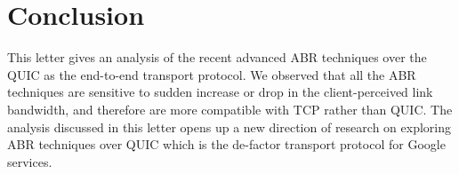 \section{Conclusion}
This letter gives an analysis of the recent advanced ABR techniques over the QUIC as the end-to-end transport protocol. We observed that all the ABR techniques are sensitive to sudden increase or drop in the client-perceived link bandwidth, and therefore are more compatible with TCP rather than QUIC.  The analysis discussed in this letter opens up a new direction of research on exploring ABR techniques over QUIC which is the de-factor transport protocol for Google services. 